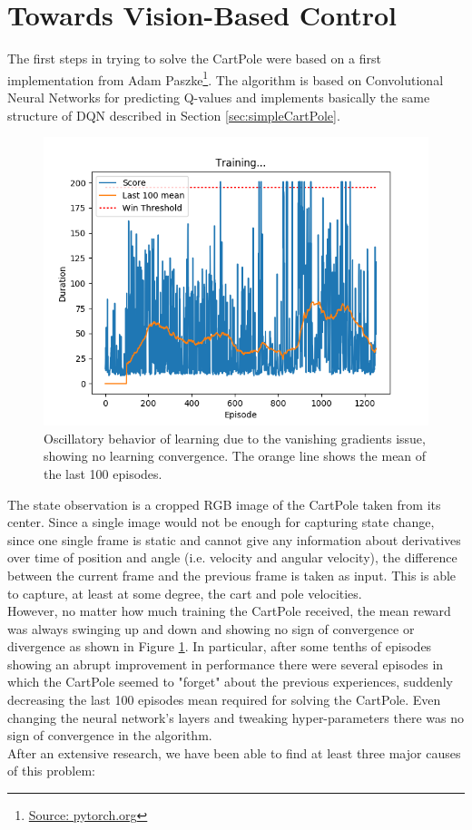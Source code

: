 \section{Towards Vision-Based Control}

The first steps in trying to solve the CartPole were based on a first implementation from Adam Paszke\footnote{\href{https://pytorch.org/tutorials/intermediate/reinforcement_q_learning.html}{Source: pytorch.org}}. The algorithm is based on Convolutional Neural Networks for predicting Q-values and implements basically the same structure of DQN described in Section \ref{sec:simpleCartPole}.
 
\begin{figure}[h!]
	\centering
	\includegraphics[width=14cm]{images/Vanishing_gradients.png}
	\caption{Oscillatory behavior of learning due to the vanishing gradients issue, showing no learning convergence. The orange line shows the mean of the last 100 episodes.}
	\label{fig:vanishingGradients}
\end{figure}

\indent The state observation is a cropped RGB image of the CartPole taken from its center. Since a single image would not be enough for capturing state change, since one single frame is static and cannot give any information about derivatives over time of position and angle (i.e. velocity and angular velocity), the difference between the current frame and the previous frame is taken as input. This is able to capture, at least at some degree, the cart and pole velocities.
\\
\indent However, no matter how much training the CartPole received, the mean reward was always swinging up and down and showing no sign of convergence or divergence as shown in Figure \ref{fig:vanishingGradients}. In particular, after some tenths of episodes showing an abrupt improvement in performance there were several episodes in which the CartPole seemed to "forget" about the previous experiences, suddenly decreasing the last 100 episodes mean required for solving the CartPole. Even changing the neural network's layers and tweaking hyper-parameters there was no sign of convergence in the algorithm.
\\
\indent After an extensive research, we have been able to find at least three major causes of this problem:

